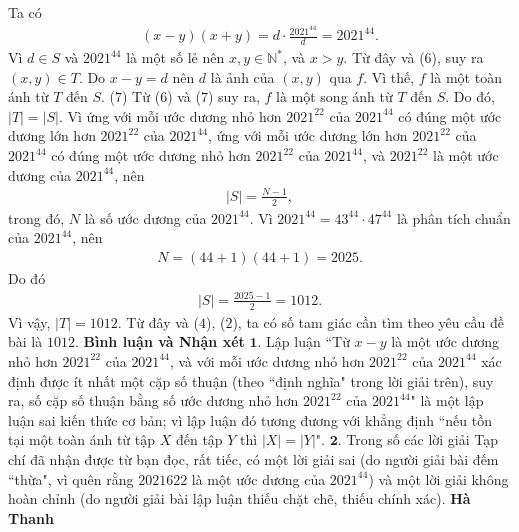 \begin{multicols}{2}
\begin{align*}
	\end{align*}
	Ta có
	\begin{align*}
		\left( {x \!-\! y} \right)\!\left( {x \!+\! y} \right) \!=\! d \!\cdot\! \frac{{{{2021}^{44}}}}{d} \!=\! {2021^{44}}. \tag{$6$}
	\end{align*}
	Vì $d \in S$ và $2021^{44}$  là một số lẻ nên $x, y \in \mathbb{N^*}$,  và $x > y$. Từ đây và ($6$), suy ra $(x, y) \in T$.
	\vskip 0.05cm
	Do $x - y = d$ nên $d$ là ảnh của $(x, y)$ qua  $f$. Vì thế,  $f$ là một toàn ánh từ $T$ đến $S$. \hfill ($7$)
	\vskip 0.05cm
	Từ ($6$) và ($7$) suy ra,  $f$ là một song ánh từ $T$ đến $S$. Do đó, $|T| = |S|$.
	\vskip 0.05cm 
	Vì ứng với mỗi ước dương nhỏ hơn $2021^{22}$  của $2021^{44}$  có đúng một ước dương lớn hơn $2021^{22}$  của  $2021^{44}$, ứng với mỗi ước dương lớn hơn $2021^{22}$   của  $2021^{44}$ có đúng một ước dương nhỏ hơn $2021^{22}$  của  $2021^{44}$, và $2021^{22}$  là một ước dương của  $2021^{44}$, nên
	\begin{align*}
		|S| = \frac{{N - 1}}{2},
	\end{align*}
	trong đó, $N$ là số ước dương của $2021^{44}$.
	\vskip 0.05cm
	Vì ${2021^{44}} = {43^{44}} \cdot {47^{44}}$ là phân tích chuẩn của $2021^{44}$, nên
	\begin{align*}
		N = \left( {44 + 1} \right)\left( {44 + 1} \right) = 2025.
	\end{align*}
	Do đó
	\begin{align*}
		|S| = \frac{{2025 - 1}}{2} = 1012.
	\end{align*}
	Vì vậy,  $|T| = 1012$. Từ đây và ($4$), ($2$), ta có số tam giác cần tìm theo yêu cầu đề bài là $1012$.
	\vskip 0.05cm
	\textbf{\color{thachthuctoanhoc}Bình luận và Nhận xét}
	\vskip 0.05cm
	$\pmb{1.}$ Lập luận ``Từ $x - y$ là một ước dương nhỏ hơn $2021^{22}$  của  $2021^{44}$, và với mỗi ước dương nhỏ hơn $2021^{22}$  của $2021^{44}$  xác định được ít nhất một cặp số thuận (theo ``định nghĩa" trong lời giải trên), suy ra, số cặp số thuận bằng số ước dương nhỏ hơn $2021^{22}$  của  $2021^{44}$" là một lập luận sai kiến thức cơ bản; vì lập luận đó tương đương với khẳng định ``nếu tồn tại một toàn ánh từ tập $X$ đến tập $Y$ thì  $|X| = |Y|$".
	\vskip 0.05cm
	$\pmb{2.}$ Trong số các lời giải Tạp chí đã nhận được từ bạn đọc, rất tiếc, có một lời giải sai (do người giải bài đếm ``thừa", vì quên rằng $20216{22}$  là một ước dương của  $2021^{44}$) và một lời giải không hoàn chỉnh (do người giải bài lập luận thiếu chặt chẽ, thiếu chính xác).
	\vskip 0.05cm
	\hfill \textbf{\color{thachthuctoanhoc}Hà Thanh}
	\vskip 0.05cm

\end{multicols}
